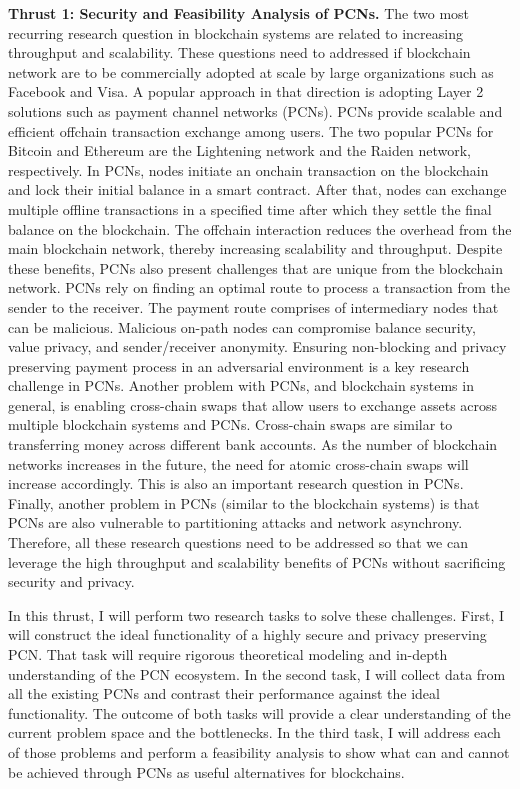 \documentclass{NSF}
\newcommand{\BfPara}[1]{{\noindent\textbf{#1.}}\xspace}
\begin{document}
\BfPara{Thrust 1: Security and Feasibility Analysis of PCNs} The two most recurring research question in blockchain systems are related to increasing throughput and scalability. These questions need to addressed if blockchain network are to be commercially adopted at scale by large organizations such as Facebook and Visa. A popular approach in that direction is adopting Layer 2 solutions such as payment channel networks (PCNs). PCNs provide scalable and efficient offchain transaction exchange among users. The two popular PCNs for Bitcoin and Ethereum are the Lightening network and the Raiden network, respectively. In PCNs, nodes initiate an onchain transaction on the blockchain and lock their initial balance in a smart contract. After that, nodes can exchange multiple offline transactions in a specified time after which they settle the final balance on the blockchain. The offchain interaction reduces the overhead from the main blockchain network, thereby increasing scalability and throughput. Despite these benefits, PCNs also present challenges that are unique from the blockchain network. PCNs rely on finding an optimal route to process a transaction from the sender to the receiver. The payment route comprises of intermediary nodes that can be malicious. Malicious on-path nodes can compromise balance security, value privacy, and sender/receiver anonymity. Ensuring non-blocking and privacy preserving payment process in  an adversarial environment is a key research challenge in PCNs. Another problem with PCNs, and blockchain systems in general, is enabling cross-chain swaps that allow users to exchange assets across multiple blockchain systems and PCNs. Cross-chain swaps are similar to transferring money across different bank accounts. As the number of blockchain networks increases in the future, the need for atomic cross-chain swaps will increase accordingly. This is also an important research question in PCNs.  Finally, another problem in PCNs (similar to the blockchain systems) is that PCNs are also vulnerable to partitioning attacks and network asynchrony. Therefore, all these research questions need to be addressed so that we can leverage the high throughput and scalability benefits of PCNs without sacrificing security and privacy. 

In this thrust, I will perform two research tasks to solve these challenges. First, I will construct the ideal functionality of a highly secure and privacy preserving PCN. That task will require rigorous theoretical modeling and in-depth understanding of the PCN ecosystem. In the second task, I will collect data from all the existing PCNs and contrast their performance against the ideal functionality. The outcome of both tasks will provide a clear understanding of the current problem space and the bottlenecks. In the third task, I will address each of those problems and perform a feasibility analysis to show what can and cannot be achieved through PCNs as useful alternatives for blockchains. 
\end{document}
